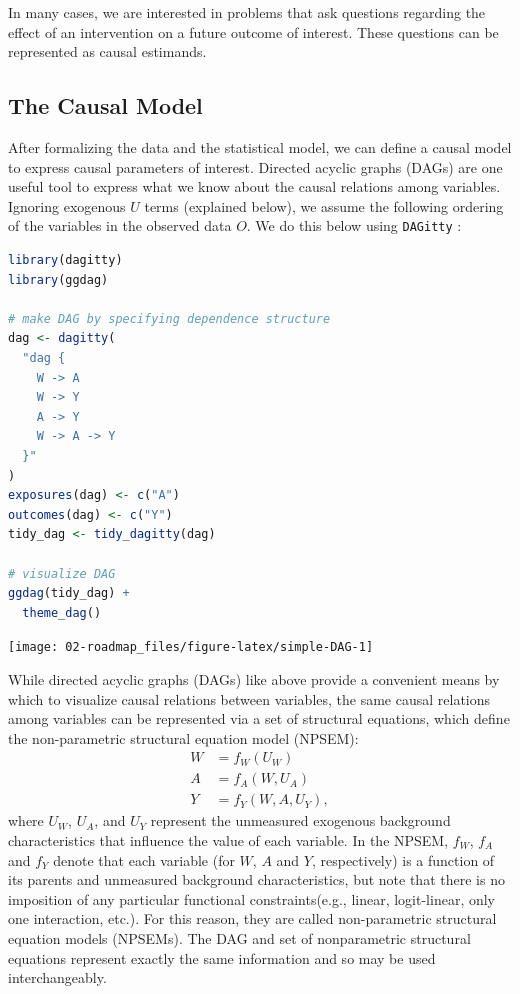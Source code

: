 \documentclass[12pt, krantz2,]{krantz}
\newcommand{\passthrough}[1]{#1}
\theoremstyle{definition}
\theoremstyle{definition}
\theoremstyle{definition}
\newcommand{\1}{\mathbbm{1}}
\begin{document}
In many cases, we are interested in problems that ask questions regarding the
effect of an intervention on a future outcome of interest. These questions can
be represented as causal estimands.

\hypertarget{the-causal-model}{%
\subsection*{The Causal Model}\label{the-causal-model}}


After formalizing the data and the statistical model, we can define a causal
model to express causal parameters of interest. Directed acyclic graphs (DAGs)
are one useful tool to express what we know about the causal relations among
variables. Ignoring exogenous \(U\) terms (explained below), we assume the
following ordering of the variables in the observed data \(O\). We do this below
using \passthrough{\lstinline!DAGitty!} \citep{textor2011dagitty}:

\begin{lstlisting}[language=R]
library(dagitty)
library(ggdag)

# make DAG by specifying dependence structure
dag <- dagitty(
  "dag {
    W -> A
    W -> Y
    A -> Y
    W -> A -> Y
  }"
)
exposures(dag) <- c("A")
outcomes(dag) <- c("Y")
tidy_dag <- tidy_dagitty(dag)

# visualize DAG
ggdag(tidy_dag) +
  theme_dag()
\end{lstlisting}

\begin{center}\texttt{[image: 02-roadmap\_files/figure-latex/simple-DAG-1]} \end{center}

While directed acyclic graphs (DAGs) like above provide a convenient means by
which to visualize causal relations between variables, the same causal relations
among variables can be represented via a set of structural equations, which
define the non-parametric structural equation model (NPSEM):
\begin{align*}
  W &= f_W(U_W) \\
  A &= f_A(W, U_A) \\
  Y &= f_Y(W, A, U_Y),
\end{align*}
where \(U_W\), \(U_A\), and \(U_Y\) represent the unmeasured exogenous background
characteristics that influence the value of each variable. In the NPSEM, \(f_W\),
\(f_A\) and \(f_Y\) denote that each variable (for \(W\), \(A\) and \(Y\), respectively)
is a function of its parents and unmeasured background characteristics, but note
that there is no imposition of any particular functional constraints(e.g.,
linear, logit-linear, only one interaction, etc.). For this reason, they are
called non-parametric structural equation models (NPSEMs). The DAG and set of
nonparametric structural equations represent exactly the same information and so
may be used interchangeably.
\end{document}
